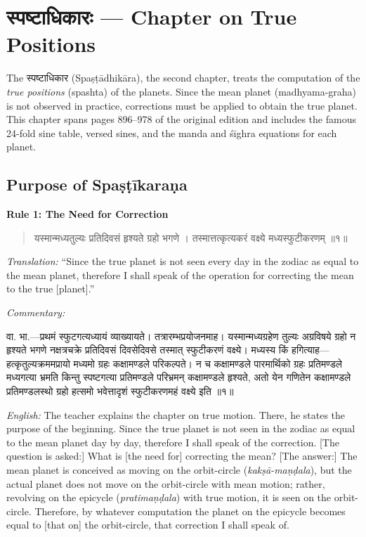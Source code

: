 \documentclass[11pt,a4paper]{book}
\newcommand{\dev}[1]{{\devanagarifont #1}}
\newenvironment{shloka}{%
  \begin{verse}
  \devanagarifont\color{versecolor}%
}{\end{verse}}
\newenvironment{vasaanaskt}{%
  \par\vspace{0.5em}\noindent\small\textit{Commentary:}%
}{\par\vspace{0.5em}}
\newcommand{\ruleheading}[1]{%
  \par\vspace{0.8em}\noindent\textbf{\color{sectioncolor}#1}\par\vspace{0.3em}%
}
\begin{document}
\clearpage

\chapter{\dev{स्पष्टाधिकारः} --- Chapter on True Positions}
\label{chap:spashta}


\noindent
The \dev{स्पष्टाधिकार} (Spaṣṭādhikāra), the second chapter, treats the computation of the \emph{true positions} (spashta) of the planets. Since the mean planet (madhyama-graha) is not observed in practice, corrections must be applied to obtain the true planet. This chapter spans pages 896--978 of the original edition and includes the famous 24-fold sine table, versed sines, and the manda and śīghra equations for each planet.

\section{Purpose of Spaṣṭīkaraṇa}

\ruleheading{Rule 1: The Need for Correction}

\begin{shloka}
\begin{altverse}
\dev{यस्मान्मध्यतुल्यः प्रतिदिवसं हृश्यते ग्रहो भगणे ।}
\dev{तस्मात्तत्कृत्यकरं वक्ष्ये मध्यस्फुटीकरणम् ॥१॥}
\end{altverse}
\end{shloka}

\textit{Translation:} ``Since the true planet is not seen every day in the zodiac as equal to the mean planet, therefore I shall speak of the operation for correcting the mean to the true [planet].''

\begin{vasaanaskt}
\dev{वा. भा.}---प्रथमं स्फुटगत्यध्यायं व्याख्यायते। तत्रारम्भप्रयोजनमाह। यस्मान्मध्यग्रहेण तुल्यः अग्रविषये ग्रहो न हृश्यते भगणे नक्षत्रचक्रे प्रतिदिवसं दिवसेदिवसे तस्मात् स्फुटीकरणं वक्ष्ये। मध्यस्य किं हगित्याह---हत्कृतुल्यक्रममप्रायो मध्यमो ग्रहः कक्षामण्डले परिकल्पते। न च कक्षामण्डले पारमार्थिको ग्रहः प्रतिमण्डले मध्यगत्या भ्रमति किन्तु स्पष्टगत्या प्रतिमण्डले परिभ्रमन् कक्षामण्डले हृश्यते, अतो येन गणितेन कक्षामण्डले प्रतिमण्डलस्थो ग्रहो हत्समो भवेत्तादृशं स्फुटीकरणमहं वक्ष्ये इति ॥१॥

\textit{English:} The teacher explains the chapter on true motion. There, he states the purpose of the beginning. Since the true planet is not seen in the zodiac as equal to the mean planet day by day, therefore I shall speak of the correction. [The question is asked:] What is [the need for] correcting the mean? [The answer:] The mean planet is conceived as moving on the orbit-circle (\textit{kakṣā-maṇḍala}), but the actual planet does not move on the orbit-circle with mean motion; rather, revolving on the epicycle (\textit{pratimaṇḍala}) with true motion, it is seen on the orbit-circle. Therefore, by whatever computation the planet on the epicycle becomes equal to [that on] the orbit-circle, that correction I shall speak of.
\end{vasaanaskt}
\end{document}
